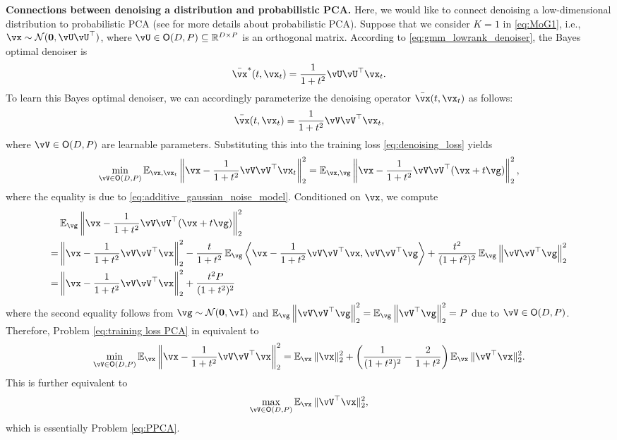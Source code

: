 \documentclass[../../book-main.tex]{subfiles}
\begin{document}
\begin{remark}
{\bf Connections between denoising a distribution and probabilistic PCA.} Here, we would like to connect denoising a low-dimensional distribution to probabilistic PCA (see  for more details about probabilistic PCA). Suppose that we consider $K=1$ in \eqref{eq:MoG1}, i.e., $\vx \sim   \dNorm(\vzero, \vU\vU^{\top})$, where \(\vU \in \O(D, P) \subseteq \R^{D \times P}\) is an orthogonal matrix. According to \eqref{eq:gmm_lowrank_denoiser}, the  Bayes optimal denoiser is 
\begin{align}
    \bar{\vx}^{\ast}(t, \vx_{t}) = \frac{1}{1 + t^{2}} \vU\vU^\top\vx_t. 
\end{align}
To learn this Bayes optimal denoiser, we can accordingly parameterize the denoising operator $\bar{\vx}(t,\vx_t)$ as follows: 
\begin{align}
    \bar{\vx}(t,\vx_t) = \frac{1}{1 + t^{2}} \vV\vV^\top\vx_t,
\end{align}
where $\vV \in \O(D, P)$ are learnable parameters. Substituting this into the training loss \eqref{eq:denoising_loss} yields 
\begin{equation}\label{eq:training loss PCA}
	  \min_{\vV \in \O(D, P)}\Ex_{\vx, \vx_{t}}\left\|\vx - \frac{1}{1 + t^{2}} \vV\vV^\top\vx_t\right\|_{2}^{2} = \Ex_{\vx, \vg}\left\|\vx - \frac{1}{1 + t^{2}} \vV\vV^\top(\vx + t\vg)\right\|_{2}^{2},
\end{equation}
where the equality is due to \eqref{eq:additive_gaussian_noise_model}. Conditioned on $\vx$, we compute 
\begin{align}
    & \Ex_{\vg}\left\|\vx - \frac{1}{1 + t^{2}} \vV\vV^\top(\vx + t\vg)\right\|_{2}^{2} \\
    = & \left\|\vx - \frac{1}{1 + t^{2}} \vV\vV^\top \vx\right\|_{2}^{2} - \frac{t}{1+t^2}\Ex_{\vg} \left\langle \vx - \frac{1}{1 + t^{2}} \vV\vV^\top \vx,  \vV\vV^\top\vg \right\rangle + \frac{t^2}{(1+t^2)^2} \Ex_{\vg}\left\| \vV\vV^\top \vg \right\|_2^2 \\
    = & \left\|\vx - \frac{1}{1 + t^{2}} \vV\vV^\top \vx\right\|_{2}^{2} + \frac{t^2P}{(1+t^2)^2} 
\end{align}
where the second equality follows from \(\vg \sim \dNorm(\vzero, \vI)\) and $ \Ex_{\vg}\left\| \vV\vV^\top \vg \right\|_2^2 = \Ex_{\vg}\left\|\vV^\top \vg \right\|_2^2 = P$ due to $\vV \in \O(D, P)$. Therefore, Problem \eqref{eq:training loss PCA} in equivalent to 
\begin{align}
    \min_{\vV \in \O(D, P)}\Ex_{\vx} \left\|\vx - \frac{1}{1 + t^{2}} \vV\vV^\top \vx\right\|_{2}^{2} = \Ex_{\vx} \|\vx\|_2^2 + \left( \frac{1}{(1+t^2)^2} - \frac{2}{1+t^2} \right) \Ex_{\vx}\|\vV^\top \vx\|_2^2.
\end{align}
This is further equivalent to 
\begin{align}
    \max_{\vV \in \O(D, P)} \Ex_{\vx}\|\vV^\top \vx\|_2^2,
\end{align}
which is essentially Problem \eqref{eq:PPCA}. 
\end{remark}
\end{document}
